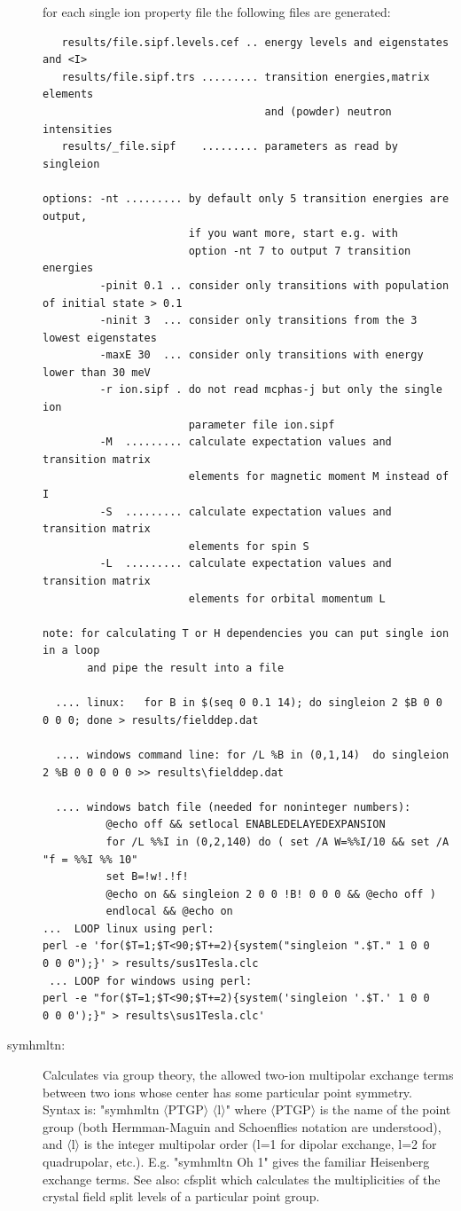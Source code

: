 \begin{description}
for each single ion property file the following files are generated:
\begin{verbatim}
   results/file.sipf.levels.cef .. energy levels and eigenstates and <I>
   results/file.sipf.trs ......... transition energies,matrix elements
                                   and (powder) neutron intensities
   results/_file.sipf    ......... parameters as read by singleion

options: -nt ......... by default only 5 transition energies are output,
                       if you want more, start e.g. with 
                       option -nt 7 to output 7 transition energies
         -pinit 0.1 .. consider only transitions with population of initial state > 0.1
         -ninit 3  ... consider only transitions from the 3 lowest eigenstates
         -maxE 30  ... consider only transitions with energy lower than 30 meV
         -r ion.sipf . do not read mcphas-j but only the single ion
                       parameter file ion.sipf
         -M  ......... calculate expectation values and transition matrix
                       elements for magnetic moment M instead of I
         -S  ......... calculate expectation values and transition matrix
                       elements for spin S
         -L  ......... calculate expectation values and transition matrix
                       elements for orbital momentum L

note: for calculating T or H dependencies you can put single ion in a loop
       and pipe the result into a file

  .... linux:   for B in $(seq 0 0.1 14); do singleion 2 $B 0 0 0 0 0; done > results/fielddep.dat

  .... windows command line: for /L %B in (0,1,14)  do singleion 2 %B 0 0 0 0 0 >> results\fielddep.dat

  .... windows batch file (needed for noninteger numbers):
          @echo off && setlocal ENABLEDELAYEDEXPANSION
          for /L %%I in (0,2,140) do ( set /A W=%%I/10 && set /A "f = %%I %% 10"
          set B=!w!.!f!
          @echo on && singleion 2 0 0 !B! 0 0 0 && @echo off )
          endlocal && @echo on 
...  LOOP linux using perl:
perl -e 'for($T=1;$T<90;$T+=2){system("singleion ".$T." 1 0 0   0 0 0");}' > results/sus1Tesla.clc
 ... LOOP for windows using perl:
perl -e "for($T=1;$T<90;$T+=2){system('singleion '.$T.' 1 0 0   0 0 0');}" > results\sus1Tesla.clc'

\end{verbatim}      

\item [\prg symhmltn:] Calculates via group theory, the allowed two-ion multipolar exchange terms
between two ions whose center has some particular point symmetry. Syntax is: 
"{\prg symhmltn $\langle$PTGP$\rangle$ $\langle$l$\rangle$}" where {\prg $\langle$PTGP$\rangle$} is 
the name of the point group (both Hermman-Maguin and Schoenflies notation are understood), and 
{\prg $\langle$l$\rangle$} is the integer multipolar order (l=1 for dipolar exchange, l=2 for 
quadrupolar, etc.).
E.g. "{\prg symhmltn Oh 1}" gives the familiar Heisenberg exchange terms. 
See also: {\prg cfsplit} which calculates the multiplicities of the crystal field split levels of a
particular point group.


\end{description}
